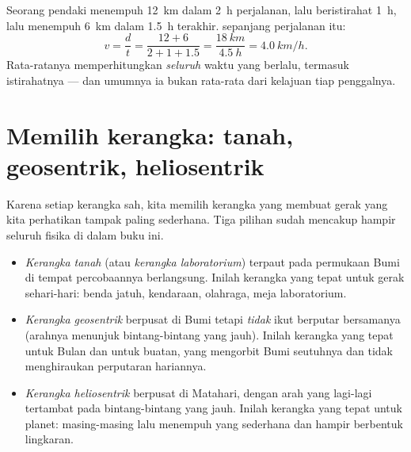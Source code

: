 \begin{example}\label{ex:g10:relative-motion:hike}
Seorang pendaki menempuh \qty{12}{km} dalam \qty{2}{h} perjalanan, lalu
beristirahat \qty{1}{h}, lalu menempuh \qty{6}{km} dalam \qty{1.5}{h}
terakhir.  sepanjang perjalanan itu:
\[
v = \frac{d}{t} = \frac{12 + 6}{2 + 1 + 1.5}
= \frac{\qty{18}{km}}{\qty{4.5}{h}} = \qty{4.0}{km/h}.
\]
Rata-ratanya memperhitungkan \emph{seluruh} waktu yang berlalu,
termasuk istirahatnya --- dan umumnya ia bukan rata-rata dari kelajuan
tiap penggalnya.
\end{example}

\section{Memilih kerangka: tanah, geosentrik, heliosentrik}

Karena setiap kerangka sah, kita memilih kerangka yang membuat gerak
yang kita perhatikan tampak paling sederhana. Tiga pilihan sudah
mencakup hampir seluruh fisika di dalam buku ini.

\begin{definition}\label{def:g10:relative-motion:frames}
\begin{itemize}
  \item \emph{Kerangka tanah} (atau \emph{kerangka
        laboratorium}) terpaut pada
        permukaan Bumi di tempat percobaannya berlangsung. Inilah
        kerangka yang tepat untuk gerak sehari-hari: benda jatuh,
        kendaraan, olahraga, meja laboratorium.
  \item \emph{Kerangka geosentrik} berpusat
        di Bumi tetapi \emph{tidak} ikut berputar bersamanya (arahnya
        menunjuk bintang-bintang yang jauh). Inilah kerangka yang tepat
        untuk Bulan dan untuk  buatan, yang mengorbit Bumi
        seutuhnya dan tidak menghiraukan perputaran hariannya.
  \item \emph{Kerangka heliosentrik}
        berpusat di Matahari, dengan arah yang lagi-lagi tertambat pada
        bintang-bintang yang jauh. Inilah kerangka yang tepat untuk
        planet: masing-masing lalu menempuh  yang sederhana dan
        hampir berbentuk lingkaran.
\end{itemize}
\end{definition}


